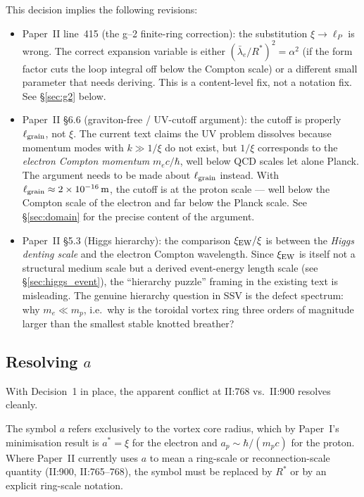 \documentclass[11pt,a4paper]{article}
\begin{document}
This decision implies the following revisions:
\begin{itemize}
\item Paper~II line~415 (the g--2 finite-ring correction): the substitution
      $\xi \to \ell_P$ is wrong.  The correct expansion variable is either
      $(\bar\lambda_e/R^*)^2 = \alpha^2$ (if the form factor cuts the loop
      integral off below the Compton scale) or a different small parameter
      that needs deriving.  This is a content-level fix, not a notation
      fix.  See \S\ref{sec:g2} below.
\item Paper~II \S6.6 (graviton-free / UV-cutoff argument): the cutoff is
      properly $\ell_{\rm grain}$, not $\xi$.  The current text claims the
      UV problem dissolves because momentum modes with $k \gg 1/\xi$ do
      not exist, but $1/\xi$ corresponds to the \emph{electron Compton
      momentum} $m_e c/\hbar$, well below QCD scales let alone Planck.
      The argument needs to be made about $\ell_{\rm grain}$ instead.
      With $\ell_{\rm grain} \approx 2\times 10^{-16}\,\mathrm{m}$, the
      cutoff is at the proton scale --- well below the Compton scale of
      the electron and far below the Planck scale.  See \S\ref{sec:domain}
      for the precise content of the argument.
\item Paper~II \S5.3 (Higgs hierarchy): the comparison
      $\xi_{\rm EW}/\xi$ is between the \emph{Higgs denting scale} and
      the electron Compton wavelength.  Since $\xi_{\rm EW}$ is itself
      not a structural medium scale but a derived event-energy length
      scale (see \S\ref{sec:higgs_event}), the ``hierarchy puzzle''
      framing in the existing text is misleading.  The genuine
      hierarchy question in SSV is the defect spectrum: why
      $m_e \ll m_p$, i.e.\ why is the toroidal vortex ring three orders
      of magnitude larger than the smallest stable knotted breather?
\end{itemize}

\subsection{Resolving $a$}

With Decision~1 in place, the apparent conflict at II:768 vs.\ II:900
resolves cleanly.

\begin{decisionbox}
The symbol $a$ refers exclusively to the vortex core radius, which by
Paper~I's minimisation result is $a^* = \xi$ for the electron and
$a_p \sim \hbar/(m_p c)$ for the proton.  Where Paper~II currently uses
$a$ to mean a ring-scale or reconnection-scale quantity (II:900,
II:765--768), the symbol must be replaced by $R^*$ or by an explicit
ring-scale notation.
\end{decisionbox}
\end{document}
